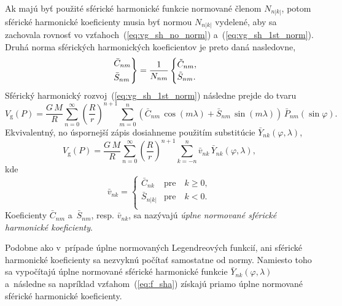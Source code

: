 \documentclass[a4paper,12pt]{book}
\newcommand{\gidx}{\mathrm g}
\begin{document}
Ak majú byť použité sférické harmonické funkcie normované členom $N_{n|k|}$,
potom sférické harmonické koeficienty musia byť normou $N_{n|k|}$ vydelené, aby
sa zachovala rovnosť vo vzťahoch~(\ref{eq:vg_sh_no_norm})
a~(\ref{eq:vg_sh_1st_norm}).  Druhá norma sférických harmonických koeficientov
je preto daná nasledovne,
%
\begin{equation}
\begin{rcases}
\bar{C}_{nm}\\
\bar{S}_{nm}
\end{rcases}
= \frac{1}{N_{nm}}
\begin{cases}
\tilde{C}_{nm}{,}\\
\tilde{S}_{nm}{.}
\end{cases}
\end{equation}
%
Sférický harmonický rozvoj~(\ref{eq:vg_sh_1st_norm}) následne prejde do tvaru
%
\begin{equation}
\label{eq:vg_sh_2nd_norm}
V_\gidx(P) = \frac{G \, M}{R} \sum_{n = 0}^\infty \left( \frac{R}{r} \right)^{n
+ 1} \sum_{m = 0}^{n} \left( \bar{C}_{nm} \, \cos(m\lambda) + \bar{S}_{nm} \,
\sin(m\lambda)\right) \, \bar{P}_{nm}(\sin\varphi){.}
\end{equation}
%
Ekvivalentný, no úspornejší zápis dosiahneme použitím substitúcie
$\bar{Y}_{nk}(\varphi, \lambda)$,
%
\begin{equation}
\label{eq:vg_sh_2nd_norm_ynk}
V_\gidx(P) = \frac{G \, M}{R} \sum_{n = 0}^\infty \left( \frac{R}{r} \right)^{n
+ 1} \sum_{k = -n}^{n} \bar{v}_{nk} \, \bar{Y}_{nk}(\varphi, \lambda){,}
\end{equation}
kde
%
\begin{equation}
\bar{v}_{nk} =
%
\begin{cases}
\bar{C}_{nk}  &\text{pre} \quad k \geq 0{,}\\
\bar{S}_{n|k|}  &\text{pre} \quad k < 0{.}\\
\end{cases}
\end{equation}
%
Koeficienty $\bar{C}_{nm}$ a~$\bar{S}_{nm}$, resp. $\bar{v}_{nk}$, sa nazývajú
\emph{úplne normované sférické harmonické koeficienty}.

Podobne ako v~prípade úplne normovaných Legendreových funkcií, ani sférické
harmonické koeficienty sa nezvyknú počítať samostatne od normy.  Namiesto toho
sa vypočítajú úplne normované sférické harmonické funkcie
$\bar{Y}_{nk}(\varphi, \lambda)$ a~následne sa napríklad
vzťahom~(\ref{eq:f_sha}) získajú priamo úplne normované sférické harmonické
koeficienty.
\end{document}
